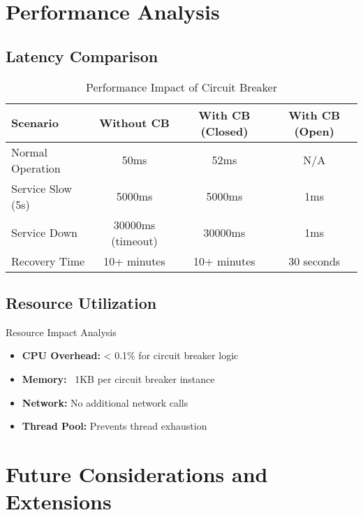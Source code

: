 \documentclass[12pt,a4paper]{article}
\begin{document}
\section{Performance Analysis}

\subsection{Latency Comparison}

\begin{table}[H]
\centering
\begin{tabular}{|l|c|c|c|}
\hline
\textbf{Scenario} & \textbf{Without CB} & \textbf{With CB (Closed)} & \textbf{With CB (Open)} \\
\hline
Normal Operation & 50ms & 52ms & N/A \\
\hline
Service Slow (5s) & 5000ms & 5000ms & 1ms \\
\hline
Service Down & 30000ms (timeout) & 30000ms & 1ms \\
\hline
Recovery Time & 10+ minutes & 10+ minutes & 30 seconds \\
\hline
\end{tabular}
\caption{Performance Impact of Circuit Breaker}
\end{table}

\subsection{Resource Utilization}

\begin{examplebox}{Resource Impact Analysis}
\begin{itemize}
    \item \textbf{CPU Overhead:} < 0.1\% for circuit breaker logic
    \item \textbf{Memory:} ~1KB per circuit breaker instance
    \item \textbf{Network:} No additional network calls
    \item \textbf{Thread Pool:} Prevents thread exhaustion
\end{itemize}
\end{examplebox}

\section{Future Considerations and Extensions}
\end{document}
